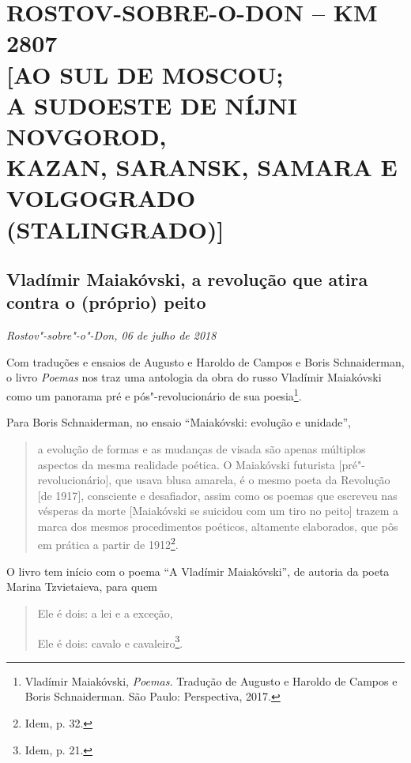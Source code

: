 \movetooddpage
{}
\part*{ROSTOV-SOBRE-O-DON -- KM 2807\\{[}AO SUL DE MOSCOU;\\A SUDOESTE DE NÍJNI NOVGOROD,\\KAZAN, SARANSK, SAMARA E\\VOLGOGRADO (STALINGRADO){]}}

\chapter*{Vladímir Maiakóvski, a revolução que atira contra o (próprio) peito}

\begin{flushright}
\emph{Rostov"-sobre"-o"-Don, 06 de julho de 2018}
\end{flushright}

Com traduções e ensaios de Augusto e Haroldo de Campos e Boris
Schnaiderman, o livro \emph{Poemas} nos traz uma antologia da obra do
russo Vladímir Maiakóvski como um panorama pré e pós"-revolucionário de
sua poesia\footnote{Vladímir Maiakóvski, \emph{Poemas.} Tradução de
  Augusto e Haroldo de Campos e Boris Schnaiderman. São Paulo:
  Perspectiva, 2017.}.

Para Boris Schnaiderman, no ensaio ``Maiakóvski: evolução e unidade'',

\begin{quote}
a evolução de formas e as mudanças de visada são apenas múltiplos
aspectos da mesma realidade poética. O Maiakóvski futurista
{[}pré"-revolucionário{]}, que usava blusa amarela, é o mesmo poeta da
Revolução {[}de 1917{]}, consciente e desafiador, assim como os poemas
que escreveu nas vésperas da morte {[}Maiakóvski se suicidou com um tiro
no peito{]} trazem a marca dos mesmos procedimentos poéticos, altamente
elaborados, que pôs em prática a partir de 1912\footnote{Idem, p. 32.}.
\end{quote}

O livro tem início com o poema ``A Vladímir Maiakóvski'', de autoria da
poeta Marina Tzvietaieva, para quem

\begin{quote}
Ele é dois: a lei e a exceção,

Ele é dois: cavalo e cavaleiro\footnote{Idem, p. 21.}.
\end{quote}

